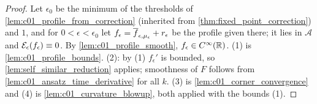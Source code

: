 \begin{proof}
  Let $\epsilon_0$ be the minimum of the thresholds of \cref{lem:c01_profile_from_correction}
  (inherited from \cref{thm:fixed_point_correction}) and $1$, and for $0<\epsilon<\epsilon_0$ let
  $f_\epsilon=\overline{f}_{\epsilon,\mu_\epsilon}+r_\epsilon$ be the profile given there; it lies in
  $\mathcal A$ and $\mathcal{E}_\epsilon(f_\epsilon)\equiv0$.  By \cref{lem:c01_profile_smooth},
  $f_\epsilon\in C^\infty(\mathbb{R})$.  (1) is \cref{lem:c01_profile_bounds}.  (2): by (1) $f_\epsilon'$ is
  bounded, so \cref{lem:self_similar_reduction} applies; smoothness of $F$ follows from
  \cref{lem:c01_ansatz_time_derivative} for all $k$.  (3) is \cref{lem:c01_corner_convergence} and (4) is
  \cref{lem:c01_curvature_blowup}, both applied with the bounds (1).
\end{proof}

